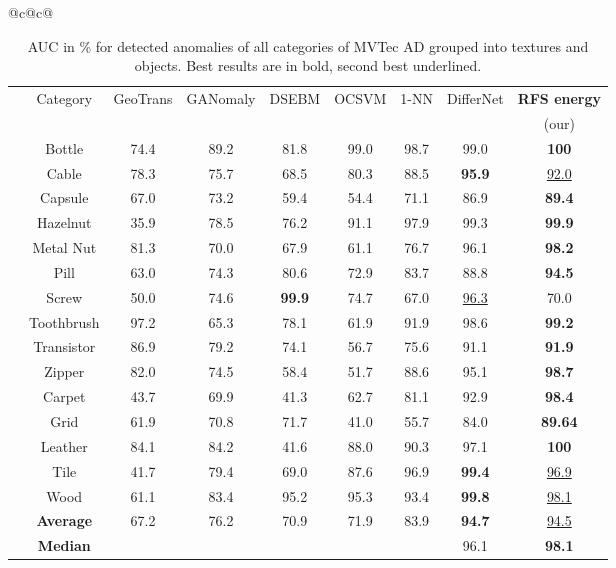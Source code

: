 \documentclass[journal]{IEEEtran}
\let\MYoriglatexcaption\caption
\renewcommand{\caption}[2][\relax]{\MYoriglatexcaption[#2]{#2}}
\begin{document}
\begin{table*}[!h]
	\caption{AUC in \% for detected anomalies of all categories of MVTec AD grouped into textures and objects. Best results are in bold, second best underlined.}
	\label{Tab:MVTec_AUC}
	\centering
\begin{tabular}{@{}c@{}c@{}} \begin{tabular}{ccccccccc}
		    \toprule
		& Category & GeoTrans & GANomaly & DSEBM & OCSVM & 1-NN & DifferNet & \textbf{RFS energy}\\
		& & \cite{geotrans} &\cite{akcay2018ganomaly}  & \cite{dsebm} & \cite{andrews}& \cite{nazare}&\cite{rudolph2021same} &(our)\\
		\cline{2-9}


		& Bottle     & 74.4 & 89.2 & 81.8 & 99.0& 98.7 & 99.0  &\textbf{100}\\
		& Cable      & 78.3 & 75.7 & 68.5 & 80.3 & 88.5 & \textbf{95.9} &\underline{92.0}\\
		& Capsule    & 67.0 & 73.2 & 59.4 & 54.4 & 71.1 & 86.9 &\textbf{89.4}\\
		& Hazelnut   & 35.9 & 78.5 & 76.2 & 91.1 & 97.9 & 99.3 &\textbf{99.9}\\
		& Metal Nut  & 81.3 & 70.0 & 67.9 & 61.1 & 76.7 & 96.1 &\textbf{98.2}\\
		\rotatebox[origin=c]{90}{\parbox[c]{0cm}{Objects}}& Pill       & 63.0 & 74.3 & 80.6 & 72.9 & 83.7 & 88.8 &\textbf{94.5}\\
		& Screw      & 50.0 & 74.6 & \textbf{99.9} & 74.7 & 67.0 & \underline{96.3} &70.0\\
		& Toothbrush & 97.2 & 65.3 & 78.1 & 61.9 & 91.9 & 98.6 &\textbf{99.2}\\
		& Transistor &86.9 & 79.2 & 74.1 & 56.7 & 75.6 & 91.1 &\textbf{91.9}\\
		& Zipper     & 82.0 & 74.5 & 58.4 & 51.7 & 88.6 & 95.1 &\textbf{98.7}\\
\cline{2-9}
		& Carpet     & 43.7 & 69.9 & 41.3 & 62.7 & 81.1 & 92.9 &\textbf{98.4}\\
		& Grid       & 61.9 & 70.8 & 71.7 & 41.0 & 55.7 & 84.0 &\textbf{89.64}\\
		& Leather    & 84.1 & 84.2 & 41.6 & 88.0 & 90.3 & 97.1 &\textbf{100}\\
		& Tile       & 41.7 & 79.4 & 69.0 & 87.6 & 96.9 & \textbf{99.4} &\underline{96.9}\\
		
		\rotatebox[origin=c]{90}{\parbox[c]{0cm}{Textures}}& Wood       & 61.1 & 83.4 & 95.2 & 95.3 & 93.4 & \textbf{99.8} &\underline{98.1}\\
		\cline{2-9}& \textbf{Average} & 67.2 & 76.2 & 70.9 & 71.9 & 83.9 &\textbf{94.7} &\underline{94.5}\\
		& \textbf{Median} &  &  &  &  &  &96.1 &\textbf{98.1}\\
		    \toprule
		
	\end{tabular}
\end{tabular}
\end{table*}	
\end{document}
